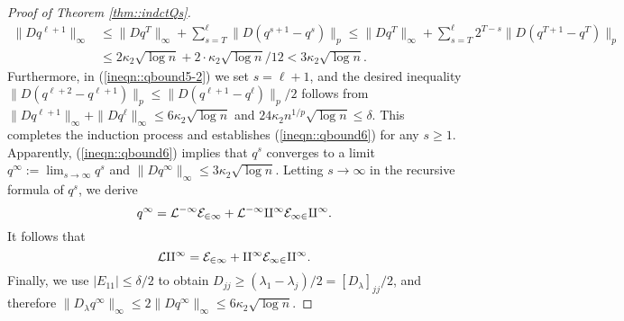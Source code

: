 \documentclass[12pt]{article}%
\theoremstyle{plain}%
\theoremstyle{remark}
\begin{document}
\begin{proof}[Proof of Theorem \ref{thm::indctQs}]
\begin{align*}
\| D q^{\ell+1} \|_\infty &\le \| D q^{T} \|_\infty + \sum_{s=T}^\ell \| D(q^{s+1} - q^s) \|_p \le  \| D q^{T} \|_\infty + \sum_{s=T}^\ell 2^{T-s} \| D(q^{T+1} - q^T) \|_p \\
&\le 2\kappa_2 \sqrt{\log n} + 2 \cdot \kappa_2 \sqrt{\log n}/12 < 3\kappa_2 \sqrt{\log n}.
\end{align*} 
Furthermore, in (\ref{ineqn::qbound5-2}) we set $s = \ell + 1$, and the desired inequality $\| D(q^{\ell+2} - q^{\ell+1}) \|_p \le \|  D(q^{\ell+1} - q^{\ell}) \|_p/2$ follows from $\| D q^{\ell+1} \|_\infty + \| D q^{\ell} \|_\infty \le 6\kappa_2\sqrt{\log n}$ and $24\kappa_2n^{1/p}\sqrt{\log n} \le \delta$. This completes the induction process and establishes (\ref{ineqn::qbound6}) for any $s \ge 1$. Apparently, (\ref{ineqn::qbound6}) implies that $q^s$ converges to a limit $q^\infty := \lim_{s \to \infty} q^s$ and $\| D q^\infty \|_\infty \le 3\kappa_2 \sqrt{\log n}$. Letting $s \to \infty$ in the recursive formula of $q^s$, we derive
\begin{equation*}
q^\infty = \cal{L}^{-1}E_{21} + \cal{L}^{-1} q^\infty E_{12} q^\infty.
\end{equation*}
It follows that
\begin{equation*}
\cal{L} q^\infty = E_{21} +  q^\infty E_{12} q^\infty.
\end{equation*}
Finally, we use $|E_{11}| \le \delta / 2$ to obtain $D_{jj} \ge (\lambda_1 - \lambda_j)/2 = [D_{\lambda}]_{jj}/2$, and therefore $\| D_\lambda q^\infty \|_\infty \le  2\| D q^\infty \|_\infty \le 6\kappa_2 \sqrt{\log n}$.
%

\end{proof}
\end{document}

